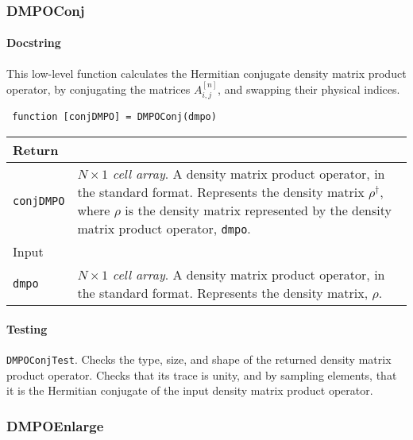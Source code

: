  \subsubsection{DMPOConj}
 \paragraph{Docstring} This low-level function calculates the Hermitian conjugate density matrix product operator, by conjugating the matrices \(A^{[n]}_{i,j}\), and swapping their physical indices.
 \begin{lstlisting}
 function [conjDMPO] = DMPOConj(dmpo) \end{lstlisting}
 \begin{longtabu}{X[1,l]X[4,l]}
 \hline
 Return & \\ \hline
 \lstinline$conjDMPO$ & \emph{\(N \times 1\) cell array}. A density matrix product operator, in the standard format. Represents the density matrix \(\rho^{\dagger}\), where \(\rho\) is the density matrix represented by the density matrix product operator, \lstinline$dmpo$. \\ \hline
 Input & \\ \hline
 \lstinline$dmpo$ & \emph{\(N \times 1\) cell array}. A density matrix product operator, in the standard format. Represents the density matrix, \(\rho\). \\
 \hline
 \end{longtabu}
 \paragraph{Testing} \lstinline$DMPOConjTest$. Checks the type, size, and shape of the returned density matrix product operator. Checks that its trace is unity, and by sampling elements, that it is the Hermitian conjugate of the input density matrix product operator.

 \subsubsection{DMPOEnlarge}
